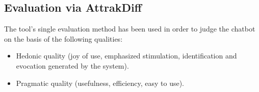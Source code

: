 \subsection{Evaluation via AttrakDiff}
The tool's single evaluation method has been used in order to judge the chatbot on the basis  of the following qualities:
\begin{itemize}
    \item Hedonic quality (joy of use, emphasized stimulation, identification and evocation generated by the system).
    \item Pragmatic quality (usefulness, efficiency, easy to use).
\end{itemize} 


